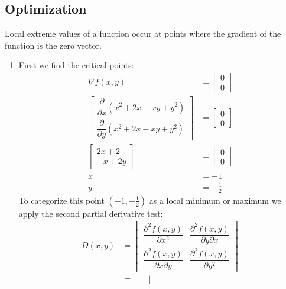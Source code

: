 \subsection{Optimization}

\BEN


\item

Local extreme values of a function occur at points where the gradient of
the function is the zero vector.

 \begin{enumerate}
  \item First we find the critical points:
   \begin{align*}
    \nabla f(x,y) &= \begin{bmatrix} 0 \\ 0 \end{bmatrix} \\
    \begin{bmatrix}
     \dfrac{\partial}{\partial x}(x^2 + 2x - xy + y^2) \\
     \dfrac{\partial}{\partial y}(x^2 + 2x - xy + y^2)
    \end{bmatrix} &= \begin{bmatrix} 0 \\ 0 \end{bmatrix} \\
    \begin{bmatrix}
     2x + 2 \\
     -x + 2y
    \end{bmatrix} &= \begin{bmatrix} 0 \\ 0 \end{bmatrix} \\
    x &= -1 \\
    y &= -\frac{1}{2}
   \end{align*}
   To categorize this point $(-1, -\frac{1}{2})$ as a local minimum or maximum
   we apply the second partial derivative test:
   \begin{align*}
    D(x,y)
    &= \begin{vmatrix}
     \dfrac{\partial^2 f(x,y)}{\partial x^2} &
      \dfrac{\partial^2 f(x,y)}{\partial y \partial x} \\
     \dfrac{\partial^2 f(x,y)}{\partial x \partial y} &
      \dfrac{\partial^2 f(x,y)}{\partial y^2}
    \end{vmatrix} \\
    &= \begin{vmatrix}

\end{vmatrix}
\end{align*}
\end{enumerate}

